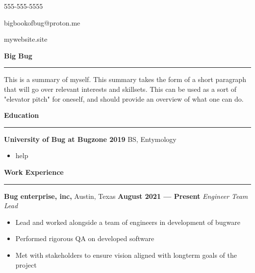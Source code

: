 \documentclass[a4paper, 12pt]{article}
\begin{document}
\begin{flushright}
{\fontsize{12pt}{12pt}\selectfont
\item 555-555-5555
\item bigbookofbug@proton.me
\item mywebsite.site
}\end{flushright}
\vspace{-40pt}
\begin{flushleft}
{\fontsize{16pt}{16pt}\selectfont
{\textbf{Big Bug}}}
\noindent\rule{\textwidth}{0.4pt}
\end{flushleft}
\begin{flushleft}
{\fontsize{12pt}{12pt}\selectfont
This is a summary of myself. This summary takes the form of a short paragraph that will go over relevant interests and skillsets. This can be used as a sort of "elevator pitch" for oneself, and should provide an overview of what one can do.}
\newline
\end{flushleft}
\begin{flushleft}
{\fontsize{12pt}{12pt}\selectfont
\textbf{Education}}
\noindent\rule{\textwidth}{0.4pt}
\end{flushleft}
\begin{flushleft}
{\textbf{University of Bug at Bugzone \hfill 2019}}
\newline
BS, Entymology\begin{multicols}{2}
\begin{itemize}
\item help
\end{itemize}
\end{multicols}
\end{flushleft}
\begin{flushleft}
{\fontsize{12pt}{12pt}\selectfont \textbf{Work Experience}}
\noindent\rule{\textwidth}{0.4pt}
\end{flushleft}
\begin{flushleft}
{\textbf{Bug enterprise, inc,} Austin, Texas \hfill 
\textbf{August 2021 --- Present}}
\newline
\textit{Engineer Team Lead}
\begin{itemize}
\item Lead and worked alongside a team of engineers in development of bugware
\item Performed rigorous QA on developed software
\item Met with stakeholders to ensure vision aligned with longterm goals of the project
\end{itemize}
\end{flushleft}
\end{document}
